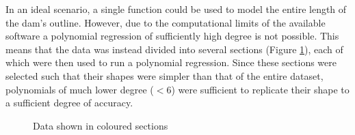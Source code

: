 \documentclass[a4paper]{article}
\theoremstyle{definition}
\begin{document}
    In an ideal scenario, a single function could be used to model the entire length of the dam's outline. However, due to the computational limits of the available software a polynomial regression of sufficiently high degree is not possible. This means that the data was instead divided into several sections (Figure \ref{figSectionedData}), each of which were then  used to run a polynomial regression. Since these sections were selected such that their shapes were simpler than that of the entire dataset, polynomials of much lower degree ($< 6$) were sufficient to replicate their shape to a sufficient degree of accuracy.

    \begin{figure} %
        \centering
        \caption{Data shown in coloured sections}
        \label{figSectionedData}
    \end{figure}
\end{document}
